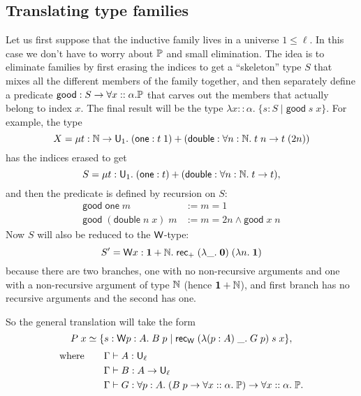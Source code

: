 \subsection{Translating type families}
Let us first suppose that the inductive family lives in a universe $1\le\ell$. In this case we don't have to worry about $\P$ and small elimination. The idea is to eliminate families by first erasing the indices to get a ``skeleton'' type $S$ that mixes all the different members of the family together, and then separately define a predicate $\mathsf{good}:S\to\forall x::\alpha.\P$ that carves out the members that actually belong to index $x$. The final result will be the type $\lambda x::\alpha.\;\{s:S\mid\mathsf{good}\;s\;x\}$. For example, the type
$$X=\mu t:\N\to\U_1.\;(\mathsf{one}:t\;1)+(\mathsf{double}:\forall n:\N.\;t\;n\to t\;(2n))$$
has the indices erased to get
$$S=\mu t:\U_1.\;(\mathsf{one}:t)+(\mathsf{double}:\forall n:\N.\;t\to t),$$
and then the predicate is defined by recursion on $S$:
\begin{align*}
\mathsf{good}\;\mathsf{one}\;m&:=m=1\\
\mathsf{good}\;(\mathsf{double}\;n\;x)\;m&:=m=2n\land \mathsf{good}\;x\;n
\end{align*}
Now $S$ will also be reduced to the $\W$-type:
$$S'=\W x:{\bf 1}+\N.\;\rec_+\;(\lambda\_.\;{\bf 0})\;(\lambda n.\;{\bf 1})$$
because there are two branches, one with no non-recursive arguments and one with a non-recursive argument of type $\N$ (hence ${\bf 1}+\N$), and first branch has no recursive arguments and the second has one.

So the general translation will take the form
$$P\;x\simeq\{s:\W p:A.\;B\;p\mid \rec_\W\;(\lambda (p:A)\; \_.\;G\;p)\;s\;x\},$$\vspace{-7mm}
\begin{align*}
\mbox{where}\qquad\Gamma&\vdash A:\U_\ell\\
\Gamma&\vdash B:A\to\U_\ell\\
\Gamma&\vdash G:\forall p:A.\;(B\;p\to\forall x::\alpha.\;\P)\to\forall x::\alpha.\;\P.
\end{align*}

